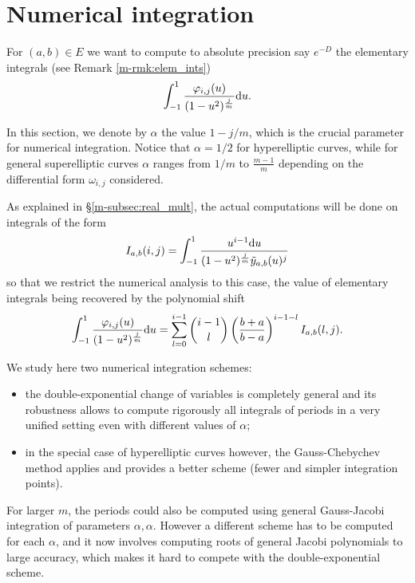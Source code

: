 \documentclass[main.tex]{subfiles}
\begin{document}
  \section{Numerical integration}\label{sec:numerical_integration}

  For $(a,b) \in E$ we want to compute to absolute precision say $e^{-D}$ the elementary integrals
  (see Remark \ref{m-rmk:elem_ints})
\begin{align*}
 \int_{-1}^1 \frac{\varphi_{i,j}(u)}{(1-u^2)^{\frac{j}{m}}}  \mathrm d u.
\end{align*}

In this section, we denote by $α$ the value $1-j/m$, which is the crucial parameter for numerical integration.
Notice that $α=1/2$ for hyperelliptic curves, while for general superelliptic curves $α$ ranges
from $1/m$ to $\frac{m-1}m$ depending on the differential form $\omega_{i,j}$ considered.


As explained in \S \ref{m-subsec:real_mult}, the actual computations will be done on integrals of the form
\begin{equation}
    \label{eq:elem_num_int}
    I_{a,b}(i,j) = \int_{-1}^1\frac{u^{i-1}\mathrm d u}{(1-u^2)^{\frac jm}\tilde{y}_{a,b}(u)^j}
\end{equation}
so that we restrict the numerical analysis to this case,
the value of elementary integrals being recovered by the polynomial shift
\begin{equation}
    \int_{-1}^1\frac{\varphi_{i,j}(u)}{(1-u^2)^{\frac jm}}\mathrm d u
    = \sum_{l=0}^{i-1} {i-1 \choose l} \left(\frac{b+a}{b-a}\right)^{i-1-l} I_{a,b}(l,j).
\end{equation}

We study here two numerical integration schemes:
\begin{itemize}
    \item 
the double-exponential change of variables is completely general and its robustness
allows to compute rigorously all integrals of periods in a very unified setting
even with different values of $\alpha$;
\item in the special case of hyperelliptic curves however, the Gauss-Chebychev method applies and
    provides a better scheme (fewer and simpler integration points).
\end{itemize}
For larger $m$, the periods could also be computed using general Gauss-Jacobi integration
of parameters $\alpha,\alpha$. However a different scheme has to be computed for each $\alpha$,
and it now involves computing roots of general Jacobi polynomials to large accuracy, which
makes it hard to compete with the double-exponential scheme.
\end{document}
